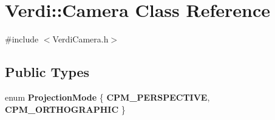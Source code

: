 \hypertarget{class_verdi_1_1_camera}{\section{\-Verdi\-:\-:\-Camera \-Class \-Reference}
\label{class_verdi_1_1_camera}
}


{\ttfamily \#include $<$\-Verdi\-Camera.\-h$>$}

\subsection*{\-Public \-Types}
\begin{DoxyCompactItemize}
\item 
enum {\bfseries \-Projection\-Mode} \{ {\bfseries \-C\-P\-M\-\_\-\-P\-E\-R\-S\-P\-E\-C\-T\-I\-V\-E}, 
{\bfseries \-C\-P\-M\-\_\-\-O\-R\-T\-H\-O\-G\-R\-A\-P\-H\-I\-C}
 \}
\end{DoxyCompactItemize}
